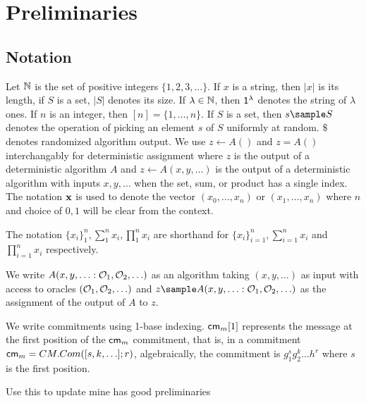 % 
% 



\section{Preliminaries}\label{sec:preliminaries}
\subsection{Notation}
Let $\mathbb{N}$ is the set of positive integers $\{1,2,3,\ldots\}$. If $x$ is a string, then $|x|$ is its length, if $S$ is a set, $|S|$ denotes its size. If $\lambda \in \mathbb{N}$, then $\mathsf{1^{\lambda}}$ denotes the string of $\lambda$ ones. If $n$ is an integer, then $[n] = \{1, \ldots,n\}.$ If $S$ is a set, then $s \sample S$ denotes the operation of picking an element $s$ of $S$ uniformly at random. $\$$ denotes randomized algorithm output. We use $z \gets A()$ and $z = A()$ interchangably for deterministic assignment where $z$ is the output of a deterministic algorithm $A$ and $z \gets A(x,y,\ldots)$ is the output of a deterministic algorithm with inputs $x,y,\ldots$ when the set, sum, or product has a single index. 
The notation $\textbf{x}$ is used to denote the vector $(x_0, \ldots,x_n)$ or $(x_1, \ldots, x_n)$ where $n$ and choice of $0, 1$ will be clear from the context.

The notation $\{x_i\}_1^n, \sum_1^n x_i, \prod_1^n x_i$ are shorthand for $\{x_i\}_{i=1}^n, \sum_{i=1}^n x_i$ and $\prod_{i=1}^n x_i$ respectively. 

We write $A(x,y,\ldots : \mathcal{O}_1, \mathcal{O}_2, \ldots)$ as an algorithm taking $(x,y,\ldots)$ as input with access to oracles $(\mathcal{O}_1, \mathcal{O}_2, \ldots)$ and $z \sample A(x,y,\ldots : \oracle_1, \oracle_2, \ldots)$ as the assignment of the output of $A$ to $z$.

We write commitments using 1-base indexing. $\mathsf{cm}_m[1]$ represents the message at the first position of the $\mathsf{cm}_m$ commitment, that is, in a commitment $\mathsf{cm}_m = CM.Com([s,k,\ldots];r)$, algebraically, the commitment is $g_1^sg_2^k\ldots h^r$ where $s$ is the first position.


Use this to update mine
\cite{hutchison_get_2010} has good preliminaries

